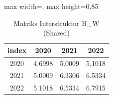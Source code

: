 \begin{table}[H]
\centering
\caption{Matriks Interstruktur H\_W (Shared)} \makeatletter{}\makeatother
\begin{adjustbox}{max width=\textwidth, max height=0.85\textheight}
\begin{tabular}{|c|c|c|c|}
\hline
\textbf{index} & \textbf{2020} & \textbf{2021} & \textbf{2022} \\
\hline
2020 & 4.6998 & 5.0009 & 5.1018 \\
2021 & 5.0009 & 6.3306 & 6.5334 \\
2022 & 5.1018 & 6.5334 & 6.7915 \\
\hline
\end{tabular}
\end{adjustbox}
\end{table}